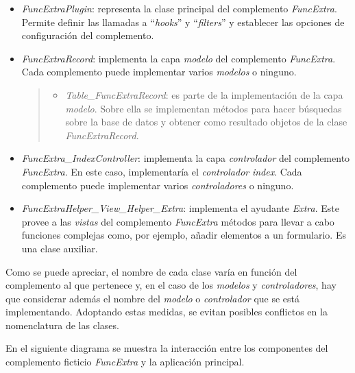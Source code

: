 \begin{itemize}
\tightlist
\item
  \emph{FuncExtraPlugin}: representa la clase principal del complemento
  \emph{FuncExtra}. Permite definir las llamadas a ``\emph{hooks}'' y
  ``\emph{filters}'' y establecer las opciones de configuración del
  complemento.
\item
  \emph{FuncExtraRecord}: implementa la capa \emph{modelo} del
  complemento \emph{FuncExtra}. Cada complemento puede implementar
  varios \emph{modelos} o ninguno.
  \begin{quote}
  \begin{itemize}
  \tightlist
  \item
    \emph{Table\_FuncExtraRecord}: es parte de la implementación de la
    capa \emph{modelo}. Sobre ella se implementan métodos para hacer
    búsquedas sobre la base de datos y obtener como resultado objetos de
    la clase \emph{FuncExtraRecord}.
  \end{itemize}
  \end{quote}
\item
  \emph{FuncExtra\_IndexController}: implementa la capa
  \emph{controlador} del complemento \emph{FuncExtra}. En este caso,
  implementaría el \emph{controlador} \emph{index}. Cada complemento
  puede implementar varios \emph{controladores} o ninguno.
\item
  \emph{FuncExtraHelper\_View\_Helper\_Extra}: implementa el ayudante
  \emph{Extra}. Este provee a las \emph{vistas} del complemento
  \emph{FuncExtra} métodos para llevar a cabo funciones complejas como,
  por ejemplo, añadir elementos a un formulario. Es una clase auxiliar.
\end{itemize}


Como se puede apreciar, el nombre de cada clase varía en función del
complemento al que pertenece y, en el caso de los \emph{modelos} y
\emph{controladores}, hay que considerar además el nombre del
\emph{modelo} o \emph{controlador} que se está implementando. Adoptando
estas medidas, se evitan posibles conflictos en la nomenclatura de las
clases.

En el siguiente diagrama se muestra la interacción entre los componentes
del complemento ficticio \emph{FuncExtra} y la aplicación principal.


